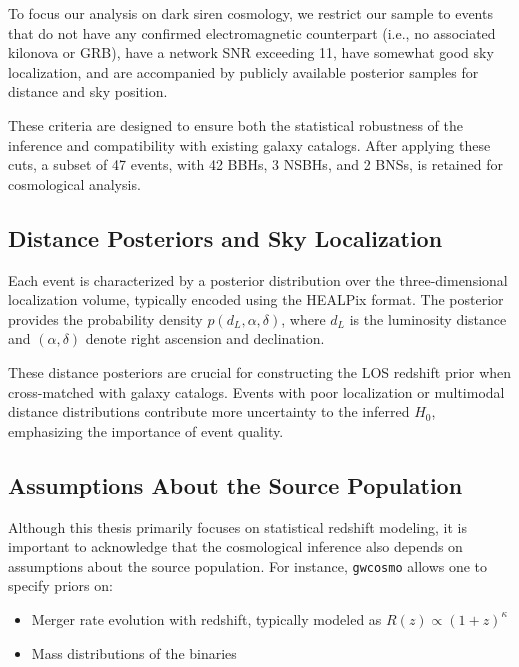 To focus our analysis on dark siren cosmology, we restrict our sample to events that do not have any confirmed electromagnetic counterpart (i.e., no associated kilonova or GRB), have a network \ac{SNR} exceeding 11, have somewhat good sky localization, and are accompanied by publicly available posterior samples for distance and sky position.

These criteria are designed to ensure both the statistical robustness of the inference and compatibility with existing galaxy catalogs. After applying these cuts, a subset of 47 events, with 42 \acp{BBH}, 3
\acp{NSBH}, and 2 \acp{BNS}, is retained for cosmological analysis.

\subsection{Distance Posteriors and Sky Localization}

Each event is characterized by a posterior distribution over the three-dimensional localization volume, typically encoded using the HEALPix format. The posterior provides the probability density $p(d_L, \alpha, \delta)$, where $d_L$ is the luminosity distance and $(\alpha, \delta)$ denote right ascension and declination.

These distance posteriors are crucial for constructing the \ac{LOS} redshift prior when cross-matched with galaxy catalogs. Events with poor localization or multimodal distance distributions contribute more uncertainty to the inferred $H_0$, emphasizing the importance of event quality.

\subsection{Assumptions About the Source Population}
\label{sec:source_population}

Although this thesis primarily focuses on statistical redshift modeling, it is important to acknowledge that the cosmological inference also depends on assumptions about the source population. For instance, \texttt{gwcosmo} allows one to specify priors on:
\begin{itemize}
  \item Merger rate evolution with redshift, typically modeled as \( R(z) \propto (1+z)^\kappa \)
  \vspace{-1em}
  \item Mass distributions of the binaries
\end{itemize}

